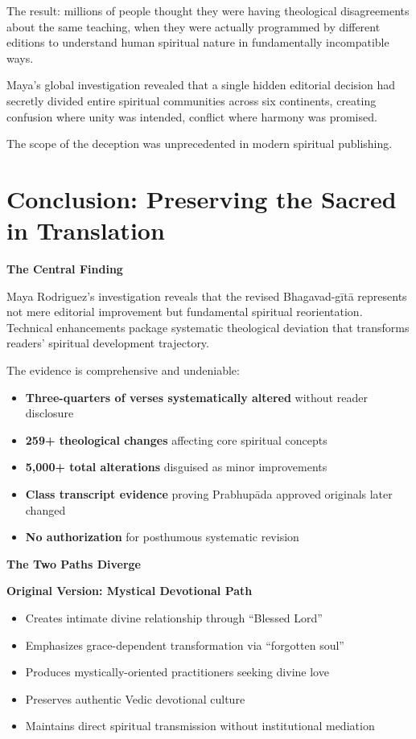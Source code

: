 \documentclass[11pt,twoside]{book}
\begin{document}
The result: millions of people thought they were having theological disagreements about the same teaching, when they were actually programmed by different editions to understand human spiritual nature in fundamentally incompatible ways.

Maya's global investigation revealed that a single hidden editorial decision had secretly divided entire spiritual communities across six continents, creating confusion where unity was intended, conflict where harmony was promised.

The scope of the deception was unprecedented in modern spiritual publishing.

\chapter*{Conclusion: Preserving the Sacred in Translation}

\textbf{The Central Finding}

Maya Rodriguez's investigation reveals that the revised Bhagavad-gītā represents not mere editorial improvement but fundamental spiritual reorientation. Technical enhancements package systematic theological deviation that transforms readers' spiritual development trajectory.

The evidence is comprehensive and undeniable:
\begin{itemize}
\item \textbf{Three-quarters of verses systematically altered} without reader disclosure
\item \textbf{259+ theological changes} affecting core spiritual concepts
\item \textbf{5,000+ total alterations} disguised as minor improvements
\item \textbf{Class transcript evidence} proving Prabhupāda approved originals later changed
\item \textbf{No authorization} for posthumous systematic revision
\end{itemize}

\textbf{The Two Paths Diverge}

\textbf{Original Version: Mystical Devotional Path}
\begin{itemize}
\item Creates intimate divine relationship through ``Blessed Lord''
\item Emphasizes grace-dependent transformation via ``forgotten soul''
\item Produces mystically-oriented practitioners seeking divine love
\item Preserves authentic Vedic devotional culture
\item Maintains direct spiritual transmission without institutional mediation
\end{itemize}
\end{document}
